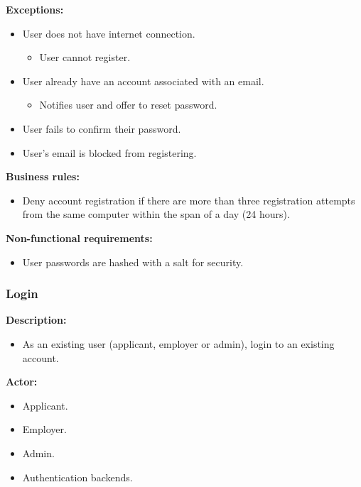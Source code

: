 \documentclass[a4paper]{article}
\begin{document}
        \textbf{Exceptions:}
        \begin{itemize}
            \item User does not have internet connection.
            \begin{itemize}
                \item User cannot register.
            \end{itemize}
            \item User already have an account associated with an email.
            \begin{itemize}
                \item Notifies user and offer to reset password.
            \end{itemize}
            \item User fails to confirm their password.
            \item User's email is blocked from registering.
        \end{itemize}
        
        \textbf{Business rules:}
        \begin{itemize}
            \item Deny account registration if there are more than three registration attempts from the same computer within the span of a day (24 hours).
        \end{itemize}

        \textbf{Non-functional requirements:}
        \begin{itemize}
            \item User passwords are hashed with a salt for security.
        \end{itemize}

        \subsubsection{Login}
        \textbf{Description:}
        \begin{itemize}
            \item As an existing user (applicant, employer or admin), login to an existing account.
        \end{itemize}

        \textbf{Actor:}
        \begin{itemize}
            \item Applicant.
            \item Employer.
            \item Admin.
            \item Authentication backends.
        \end{itemize}
\end{document}
